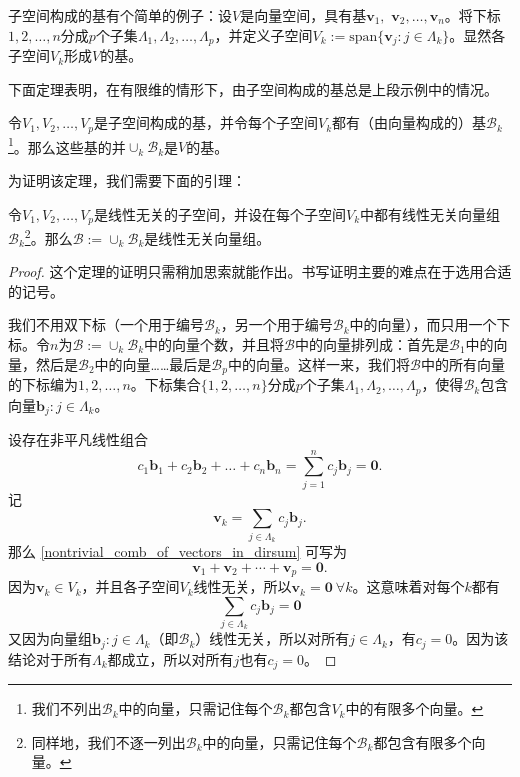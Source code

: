 子空间构成的基有个简单的例子：设$V$是向量空间，具有基$\mathbf{v}_{1},$ $\mathbf{v}_{2},\ldots,\mathbf{v}_{n}$。将下标$1,2,\dots,n$分成$p$个子集$\Lambda_{1},\Lambda_{2},\ldots,\Lambda_{p}$，并定义子空间$V_{k}:=\mathrm{span}\{\mathbf{v}_{j}:j\in\Lambda_{k}\}$。显然各子空间$V_k$形成$V$的基。

下面定理表明，在有限维的情形下，由子空间构成的基总是上段示例中的情况。

\begin{theorem}\label{thm:union_of_basis_in_subspace_li_basis}
    令$V_1,V_2,\ldots,V_p$是子空间构成的基，并令每个子空间$V_k$都有（由向量构成的）基$\mathcal{B}_k$\footnote{我们不列出$\mathcal{B}_k$中的向量，只需记住每个$\mathcal{B}_k$都包含$V_k$中的有限多个向量。}。那么这些基的并$\cup_k\mathcal{B}_k$是$V$的基。
\end{theorem}

为证明该定理，我们需要下面的引理：
\begin{lemma}\label{lem:union_of_basis_in_subspace_li}
    令$V_1,V_2,\ldots,V_p$是线性无关的子空间，并设在每个子空间$V_k$中都有线性无关向量组$\mathcal{B}_k$\footnote{同样地，我们不逐一列出$\mathcal{B}_k$中的向量，只需记住每个$\mathcal{B}_k$都包含有限多个向量。}。那么$\mathcal{B}:=\cup_k\mathcal{B}_k$是线性无关向量组。
\end{lemma}
\begin{proof}
    这个定理的证明只需稍加思索就能作出。书写证明主要的难点在于选用合适的记号。
    
    我们不用双下标（一个用于编号$\mathcal{B}_k$，另一个用于编号$\mathcal{B}_k$中的向量），而只用一个下标。令$n$为$\mathcal{B}:=\cup_k\mathcal{B}_k$中的向量个数，并且将$\mathcal{B}$中的向量排列成：首先是$\mathcal{B}_1$中的向量，然后是$\mathcal{B}_2$中的向量……最后是$\mathcal{B}_p$中的向量。这样一来，我们将$\mathcal{B}$中的所有向量的下标编为$1,2,\dots,n$。下标集合$\{1,2,\dots,n\}$分成$p$个子集$\Lambda_{1},\Lambda_{2},\ldots,\Lambda_{p}$，使得$\mathcal{B}_k$包含向量$\mathbf{b}_{j}:j\in\Lambda_{k}$。

    设存在非平凡线性组合
    \begin{equation}\label{nontrivial_comb_of_vectors_in_dirsum}
        c_1\mathbf{b}_1+c_2\mathbf{b}_2+\ldots+c_n\mathbf{b}_n=\sum_{j=1}^nc_j\mathbf{b}_j=\mathbf{0}.
    \end{equation}
    记\[\mathbf{v}_k=\sum_{j\in\Lambda_k}c_j\mathbf{b}_j.\]
    那么 \eqref{nontrivial_comb_of_vectors_in_dirsum} 可写为
    \[\mathbf{v}_1+\mathbf{v}_2+\cdots+\mathbf{v}_p=\mathbf{0}.\]
    因为$\mathbf{v}_k\in V_k$，并且各子空间$V_k$线性无关，所以$\mathbf{v}_k=\mathbf{0}\ \forall k$。这意味着对每个$k$都有\[\sum_{j\in\Lambda_k}c_j\mathbf{b}_j=\mathbf{0}\]
    又因为向量组$\mathbf{b}_{j}:j\in\Lambda_{k}$（即$\mathcal{B}_k$）线性无关，所以对所有$j\in\Lambda_k$，有$c_j=0$。因为该结论对于所有$\Lambda_k$都成立，所以对所有$j$也有$c_j=0$。
\end{proof}

